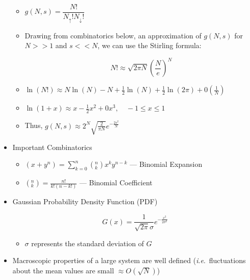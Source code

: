 \begin{itemize}
\begin{itemize}
          \item $g(N,s)=\dfrac{N!}{N_{\uparrow}!N_{\downarrow}!}$

          \item Drawing from combinatorics below, an approximation of $g(N,s)$ for $N>>1$ and $s<<N$, we can use the Stirling formula:

            $$N!\approx\sqrt{2\pi N}\left( \frac{N}{e} \right)^N$$

          \item $\ln(N!)\approx N\ln(N)-N+\frac{1}{2}\ln(N)+\frac{1}{2}\ln(2\pi)+0\left( \frac{1}{N} \right)$

          \item $\ln(1+x)\approx x-\frac{1}{2}x^2+0x^3,\quad -1\leq x\leq 1$

          \item Thus, $g(N,s)\approx 2^N\sqrt{\frac{2}{\pi N}}e^{-\frac{2s^2}{N}}$

    \end{itemize}

  \item Important Combinatorics

    \begin{itemize}

      \item $(x+y^n)=\displaystyle\sum_{k=0}^n \left( ^n_k \right)x^ky^{n-k}$ — Binomial Expansion

      \item \large$\left( ^n_k \right)=\frac{n!}{k!(n-k!)}$ \normalsize — Binomial Coefficient

    \end{itemize}

  \item Gaussian Probability Density Function (PDF)

    $$G(x)=\frac{1}{\sqrt{2\pi}\sigma}e^{-\frac{x^2}{2\sigma^2}}$$

    \begin{itemize}

      \item $\sigma$ represents the standard deviation of $G$

    \end{itemize}

  \item Macroscopic properties of a large system are well defined (\textit{i}.\textit{e}.\ fluctuations about the mean values are small $\approx O(\sqrt{N})$)

\end{itemize}



